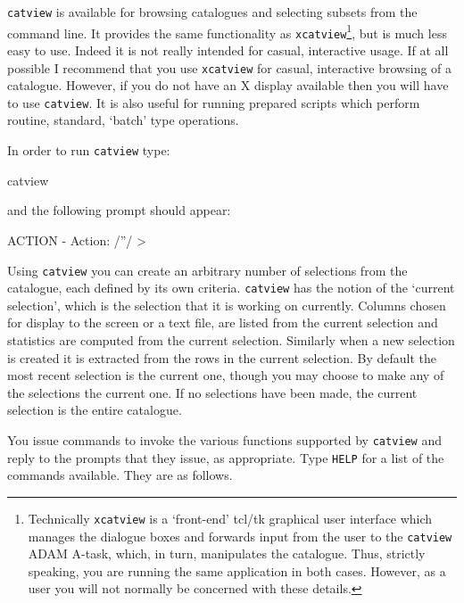 \documentclass[twoside,11pt]{starlink}
\begin{document}
\texttt{catview} is available for browsing catalogues and selecting subsets
from the command line. It provides the same functionality as
\texttt{xcatview}\footnote{Technically \texttt{xcatview} is a `front-end'
tcl/tk graphical user interface which manages the dialogue boxes and
forwards input from the user to the \texttt{catview} ADAM A-task, which,
in turn, manipulates the catalogue. Thus, strictly speaking, you are
running the same application in both cases. However, as a user you will
not normally be concerned with these details.}, but is much less easy to
use. Indeed it is not really intended for casual, interactive usage. If at
all possible I recommend that you use \texttt{xcatview} for casual, interactive
browsing of a catalogue. However, if you do not have an X display available
then you will have to use \texttt{catview}. It is also useful for running
prepared scripts which perform routine, standard, `batch' type operations.

In order to run \texttt{catview} type:

\begin{terminalv}
catview
\end{terminalv}

and the following prompt should appear:

\begin{terminalv}
ACTION - Action: /''/ >
\end{terminalv}

Using \texttt{catview} you can create an arbitrary number of selections from
the catalogue, each defined by its own criteria. \texttt{catview} has the
notion of the `current selection', which is the selection that it is
working on currently.  Columns chosen for display to the screen or a
text file, are listed from the current selection and statistics are
computed from the current selection.  Similarly when a new selection is
created it is extracted from the rows in the current selection.  By default
the most recent selection is the current one, though you may choose to make
any of the selections the current one.  If no selections have been made, the
current selection is the entire catalogue.

You issue commands to invoke the various functions supported by \texttt{catview} and reply to the prompts that they issue, as appropriate.
Type \texttt{HELP} for a list of the commands available.  They are as
follows.
\end{document}
